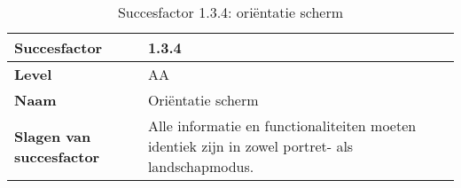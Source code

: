 \begin{table}
    \centering
    \caption{Succesfactor 1.3.4: oriëntatie scherm }
    \hspace*{-1cm}\begin{tabular}{|l|p{12cm}|} 
        \hline
        \textbf{Succesfactor}                 & 1.3.4                                                                                                                                                                                                                                                                                                                                                                                                                                                                                                             \\ 
        \hline
        \textbf{Level}                        & AA                                                                                                                                                                                                                                                                                                                                                                                                                                                                                                                 \\ 
        \hline
        \textbf{Naam}                         & Oriëntatie scherm~                                                                                                                                                                                                                                                                                                                                                                                                                                                                                      \\ 
        \hline
        \textbf{Slagen van succesfactor}      & Alle informatie en functionaliteiten moeten identiek zijn in zowel portret- als landschapmodus.                                                                                                                                                                                                                                                                                                                                                            \\ 

\end{tabular}
\end{table}

